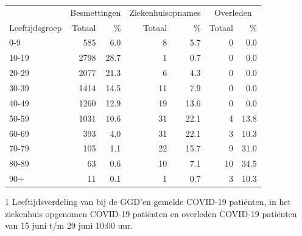 \documentclass[
  english,
  man,floatsintext]{apa6}
\begin{document}
\begin{table}
\centering\begingroup\fontsize{11}{13}\selectfont

\begin{threeparttable}
\begin{tabular}{lrrrrrr}
\toprule
\multicolumn{1}{c}{ } & \multicolumn{2}{c}{Besmettingen} & \multicolumn{2}{c}{Ziekenhuisopnames} & \multicolumn{2}{c}{Overleden} \\
\cmidrule(l{3pt}r{3pt}){2-3} \cmidrule(l{3pt}r{3pt}){4-5} \cmidrule(l{3pt}r{3pt}){6-7}
Leeftijdsgroep & Totaal & \% & Totaal & \% & Totaal & \%\\
\midrule
0-9 & 585 & 6.0 & 8 & 5.7 & 0 & 0.0\\
10-19 & 2798 & 28.7 & 1 & 0.7 & 0 & 0.0\\
20-29 & 2077 & 21.3 & 6 & 4.3 & 0 & 0.0\\
30-39 & 1414 & 14.5 & 11 & 7.9 & 0 & 0.0\\
40-49 & 1260 & 12.9 & 19 & 13.6 & 0 & 0.0\\
50-59 & 1031 & 10.6 & 31 & 22.1 & 4 & 13.8\\
60-69 & 393 & 4.0 & 31 & 22.1 & 3 & 10.3\\
70-79 & 105 & 1.1 & 22 & 15.7 & 9 & 31.0\\
80-89 & 63 & 0.6 & 10 & 7.1 & 10 & 34.5\\
90+ & 11 & 0.1 & 1 & 0.7 & 3 & 10.3\\
\bottomrule
\end{tabular}
\begin{tablenotes}
\item[1] Leeftijdsverdeling van bij de GGD’en gemelde COVID-19 patiënten, in het ziekenhuis opgenomen COVID-19 patiënten en overleden COVID-19 patiënten van 15 juni t/m 29 juni 10:00 uur.
\end{tablenotes}
\end{threeparttable}
\endgroup{}
\end{table}

\newpage
\end{document}
